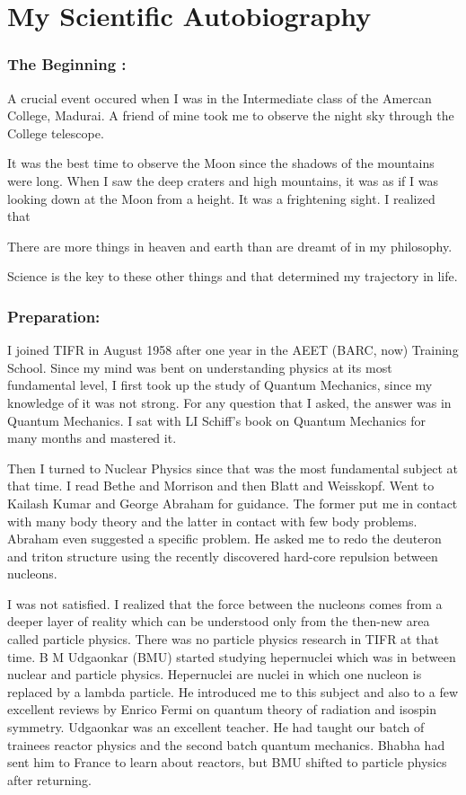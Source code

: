 \chapter{My Scientific Autobiography}

\subsection*{The Beginning :}

A crucial event occured when I was in the Intermediate class of the 
Amercan College, Madurai. A friend of mine took me to observe the night 
sky through the College telescope.
\smallskip

It was the best time to observe the Moon since the shadows of the 
mountains were long. When I saw the deep craters and high mountains, it 
was as if I was looking down at the Moon from a height. It was a 
frightening sight. I realized that
\smallskip

There are more things in heaven and earth than are dreamt of in my 
philosophy.
\smallskip

Science is the key to these other things and that determined my 
trajectory in life.

\subsection*{Preparation: }

I joined TIFR in August 1958 after one year in the AEET (BARC, now) 
Training School.  Since my mind was bent on understanding physics at its 
most fundamental level, I first took up the study of Quantum Mechanics, 
since my knowledge of it was not strong. For any question that I asked, 
the answer was in Quantum Mechanics. I sat with LI Schiff's book on 
Quantum Mechanics for many months and mastered it.

Then I turned to Nuclear Physics since that was the most fundamental 
subject at that time. I read Bethe and Morrison and then Blatt and 
Weisskopf. Went to Kailash Kumar and George Abraham for guidance. The 
former put me in contact with many body theory and the latter in contact 
with few body problems. Abraham even suggested a specific problem. He 
asked me to redo the deuteron and triton structure using the recently 
discovered hard-core repulsion between nucleons.

I was not satisfied. I realized that the force between the nucleons 
comes from a deeper layer of reality which can be understood only from 
the then-new area called particle physics. There was no particle physics 
research in TIFR at that time. B M Udgaonkar (BMU) started studying 
hepernuclei which was in between nuclear and particle physics. 
Hepernuclei are nuclei in which one nucleon is replaced by a lambda 
particle. He introduced me to this subject and also to a few excellent 
reviews by Enrico Fermi on quantum theory of radiation and isospin 
symmetry. Udgaonkar was an excellent teacher. He had taught our batch of 
trainees reactor physics and the second batch quantum mechanics. Bhabha 
had sent him to France to learn about reactors, but BMU shifted to 
particle physics after returning.
\smallskip

